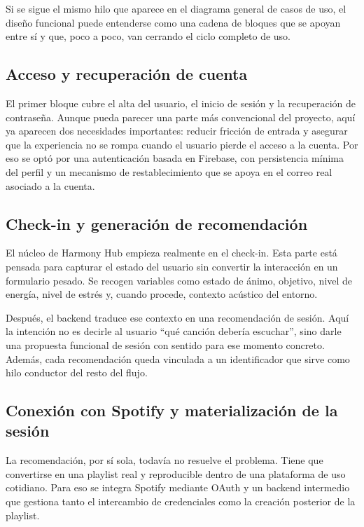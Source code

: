 Si se sigue el mismo hilo que aparece en el diagrama general de casos de uso,
el diseño funcional puede entenderse como una cadena de bloques que se apoyan
entre sí y que, poco a poco, van cerrando el ciclo completo de uso.

\subsection{Acceso y recuperación de cuenta}

El primer bloque cubre el alta del usuario, el inicio de sesión y la
recuperación de contraseña. Aunque pueda parecer una parte más convencional del
proyecto, aquí ya aparecen dos necesidades importantes: reducir fricción de
entrada y asegurar que la experiencia no se rompa cuando el usuario pierde el
acceso a la cuenta. Por eso se optó por una autenticación basada en Firebase,
con persistencia mínima del perfil y un mecanismo de restablecimiento que se
apoya en el correo real asociado a la cuenta.

\subsection{Check-in y generación de recomendación}

El núcleo de Harmony Hub empieza realmente en el check-in. Esta parte está
pensada para capturar el estado del usuario sin convertir la interacción en un
formulario pesado. Se recogen variables como estado de ánimo, objetivo, nivel
de energía, nivel de estrés y, cuando procede, contexto acústico del entorno.

Después, el backend traduce ese contexto en una recomendación de sesión. Aquí
la intención no es decirle al usuario ``qué canción debería escuchar'', sino
darle una propuesta funcional de sesión con sentido para ese momento concreto.
Además, cada recomendación queda vinculada a un identificador que sirve como
hilo conductor del resto del flujo.

\subsection{Conexión con Spotify y materialización de la sesión}

La recomendación, por sí sola, todavía no resuelve el problema. Tiene que
convertirse en una playlist real y reproducible dentro de una plataforma de uso
cotidiano. Para eso se integra Spotify mediante OAuth y un backend intermedio
que gestiona tanto el intercambio de credenciales como la creación posterior de
la playlist.

